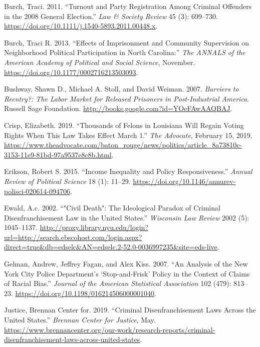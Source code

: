 \documentclass[
  12pt,
]{article}
\newlength{\cslhangindent}
\newenvironment{cslreferences}%
  {\setlength{\parindent}{0pt}%
  \everypar{\setlength{\hangindent}{\cslhangindent}}\ignorespaces}%
  {\par}
\begin{document}
\begin{cslreferences}
\leavevmode\hypertarget{ref-Burch2011}{}%
Burch, Traci. 2011. ``Turnout and Party Registration Among Criminal Offenders in the 2008 General Election.'' \emph{Law \& Society Review} 45 (3): 699--730. \url{https://doi.org/10.1111/j.1540-5893.2011.00448.x}.

\leavevmode\hypertarget{ref-Burch2013}{}%
Burch, Traci R. 2013. ``Effects of Imprisonment and Community Supervision on Neighborhood Political Participation in North Carolina:'' \emph{The ANNALS of the American Academy of Political and Social Science}, November. \url{https://doi.org/10.1177/0002716213503093}.

\leavevmode\hypertarget{ref-Bushway2007}{}%
Bushway, Shawn D., Michael A. Stoll, and David Weiman. 2007. \emph{Barriers to Reentry?: The Labor Market for Released Prisoners in Post-Industrial America}. Russell Sage Foundation. \url{http://books.google.com?id=YOeFAwAAQBAJ}.

\leavevmode\hypertarget{ref-Crisp2019}{}%
Crisp, Elizabeth. 2019. ``Thousands of Felons in Louisiana Will Regain Voting Rights When This Law Takes Effect March 1.'' \emph{The Advocate}, February 15, 2019. \url{https://www.theadvocate.com/baton_rouge/news/politics/article_8a73810c-3153-11e9-81bd-97a9537e8c8b.html}.

\leavevmode\hypertarget{ref-Erikson2015}{}%
Erikson, Robert S. 2015. ``Income Inequality and Policy Responsiveness.'' \emph{Annual Review of Political Science} 18 (1): 11--29. \url{https://doi.org/10.1146/annurev-polisci-020614-094706}.

\leavevmode\hypertarget{ref-Ewald2002}{}%
Ewald, A.c. 2002. ``"Civil Death": The Ideological Paradox of Criminal Disenfranchisement Law in the United States.'' \emph{Wisconsin Law Review} 2002 (5): 1045--1137. \url{http://proxy.library.nyu.edu/login?url=http://search.ebscohost.com/login.aspx?direct=true\&db=edselc\&AN=edselc.2-52.0-0036997235\&site=eds-live}.

\leavevmode\hypertarget{ref-Gelman2007}{}%
Gelman, Andrew, Jeffrey Fagan, and Alex Kiss. 2007. ``An Analysis of the New York City Police Department's `Stop-and-Frisk' Policy in the Context of Claims of Racial Bias.'' \emph{Journal of the American Statistical Association} 102 (479): 813--23. \url{https://doi.org/10.1198/016214506000001040}.

\leavevmode\hypertarget{ref-bcj_laws}{}%
Justice, Brennan Center for. 2019. ``Criminal Disenfranchisement Laws Across the United States.'' \emph{Brennan Center for Justice}, May. \url{https://www.brennancenter.org/our-work/research-reports/criminal-disenfranchisement-laws-across-united-states}.


\end{cslreferences}
\end{document}
